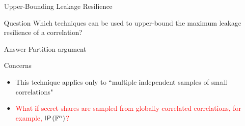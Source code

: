\begin{frame}{Upper-Bounding Leakage Resilience}

{
	\begin{block}{Question}
		Which techniques can be used to upper-bound the maximum leakage resilience of a correlation?
	\end{block}
}

\pause

{
	\begin{block}{Answer}
		Partition argument
	\end{block}
}

\pause

{
\begin{block}{Concerns}
\begin{itemize}
	\item This technique applies only to ``multiple independent samples of small correlations"
	\item \textcolor{red}{What if secret shares are sampled from globally correlated correlations, for example, $ \IP[\bbF^n] $?}
\end{itemize}
\end{block}
}

\end{frame}

